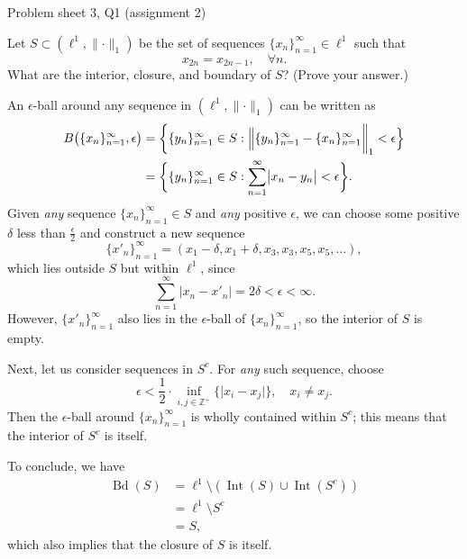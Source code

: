 \begin{problem}{Problem sheet 3, Q1 (assignment 2)}{}


    Let $S \subset (\ell^1, \lVert \cdot \rVert_1)$ be the set of sequences $\{ x_n \}_{n=1}^\infty \in \ell^1$ such that
        $$ x_{2n} = x_{2n - 1}, \quad \forall n . $$
    What are the interior, closure, and boundary of $S$? (Prove your answer.)

    \tcblower

    An $\epsilon$-ball around any sequence in $(\ell^1, \lVert \cdot \rVert_1)$ can be written as
        \begin{align*}
            B \bigl( \{ x_n \}_{n=1}^\infty, \epsilon \bigr)
                &= \biggl\{ \{ y_n \}_{n=1}^\infty \in S :
                \Bigl\Vert
                    \{ y_n \}_{n=1}^\infty
                    - \{ x_n \}_{n=1}^\infty 
                \biggr\Vert_1 < \epsilon \Bigr\} \\
            &= \biggl\{
                \{ y_n \}_{n=1}^\infty \in S :
                \sum_{n = 1}^\infty
                \bigl\vert x_n - y_n \bigr\vert < \epsilon
            \biggr\} .
        \end{align*}
    Given \textit{any} sequence $\{ x_n \}_{n=1}^\infty \in S$ and \textit{any} positive $\epsilon$, we can choose some positive $\delta$ less than $\frac{\epsilon}{2}$ and construct a new sequence
        $$ \{ x'_n \}_{n=1}^\infty = (x_1 - \delta, x_1 + \delta, x_3, x_3, x_5, x_5, \ldots) , $$
    which lies outside $S$ but within $\ell^1$, since
        $$ \sum_{n = 1}^\infty
            \bigl\vert x_n - x'_n \bigr\vert
            = 2 \delta < \epsilon < \infty . $$
    However, $\{ x'_n \}_{n=1}^\infty$ also lies in the $\epsilon$-ball of $\{ x_n \}_{n=1}^\infty$, so the interior of $S$ is empty.

    Next, let us consider sequences in $S^c$. For \textit{any} such sequence, choose
        $$ \epsilon < \frac{1}{2} \cdot \inf_{i, j \in \mathbb{Z}^+} \bigl\{ \lvert x_i - x_j \rvert \bigr\}, \quad x_i \neq x_j . $$
    Then the $\epsilon$-ball around $\{ x_n \}_{n=1}^\infty$ is wholly contained within $S^c$; this means that the interior of $S^c$ is itself.

    To conclude, we have
        \begin{align*}
            \operatorname{Bd}(S)
                &= \ell^1 \setminus (\operatorname{Int}(S) \cup \operatorname{Int}(S^c)) \\
            &= \ell^1 \setminus S^c \\
            &= S ,
        \end{align*}
    which also implies that the closure of $S$ is itself.
        
\end{problem}

